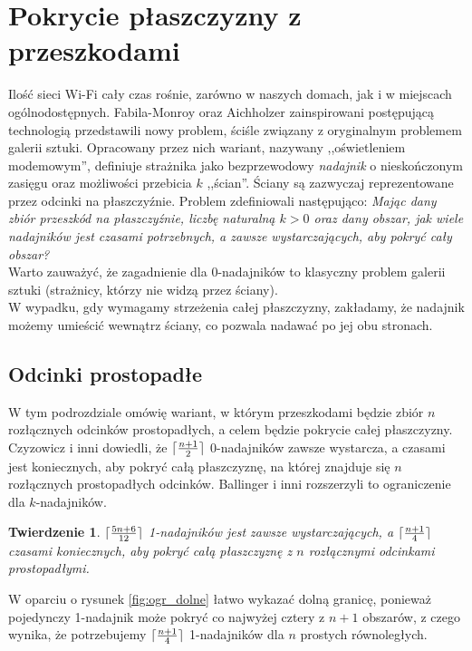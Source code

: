 \documentclass{xmgr}
\DeclarePairedDelimiter\ceil{\lceil}{\rceil}
\newtheorem{Twierdzenie}{Twierdzenie}
\theoremstyle{definition}
\begin{document}
\section{Pokrycie płaszczyzny z przeszkodami}\label{sec:knadajniki}
	Ilość sieci Wi-Fi cały czas rośnie, zarówno w naszych domach, jak i w miejscach ogólnodostępnych. Fabila-Monroy oraz Aichholzer \cite{fabilamonroy} zainspirowani postępującą technologią przedstawili nowy problem, ściśle związany z oryginalnym problemem galerii sztuki. Opracowany przez nich wariant, nazywany ,,oświetleniem modemowym'', definiuje strażnika jako bezprzewodowy \emph{nadajnik} o nieskończonym zasięgu oraz możliwości przebicia $k$ ,,ścian''. Ściany są zazwyczaj reprezentowane przez odcinki na płaszczyźnie. Problem zdefiniowali następująco: \emph{Mając dany zbiór przeszkód na płaszczyźnie, liczbę naturalną $k > 0$ oraz dany obszar, jak wiele nadajników jest czasami potrzebnych, a zawsze wystarczających, aby pokryć cały obszar?}  
\\\indent Warto zauważyć, że zagadnienie dla 0-nadajników to klasyczny problem galerii sztuki (strażnicy, którzy nie widzą przez ściany).
\\\indent W wypadku, gdy wymagamy strzeżenia całej płaszczyzny, zakładamy, że nadajnik możemy umieścić wewnątrz ściany, co pozwala nadawać po jej obu stronach.
\subsection{Odcinki prostopadłe}
W tym podrozdziale omówię wariant, w którym przeszkodami będzie zbiór $n$ rozłącznych odcinków prostopadłych, a celem będzie pokrycie całej płaszczyzny. Czyzowicz i inni \cite{czyzowicz} dowiedli, że $\ceil{\frac{n+1}{2}}$ 0-nadajników zawsze wystarcza, a czasami jest koniecznych, aby pokryć całą płaszczyznę, na której znajduje się $n$ rozłącznych prostopadłych odcinków. Ballinger i inni \cite{knadajniki} rozszerzyli to ograniczenie dla $k$-nadajników.

\begin{Twierdzenie} \label{ograniczenie zbiór odcinków prostopadłych} \cite{knadajniki}
  $\ceil{\frac{5n+6}{12}}$ 1-nadajników jest zawsze wystarczających, a $\ceil{\frac{n+1}{4}}$ czasami koniecznych, aby pokryć całą płaszczyznę z $n$ rozłącznymi odcinkami prostopadłymi.
\end{Twierdzenie}
\indent W oparciu o rysunek \ref{fig:ogr_dolne} łatwo wykazać dolną granicę, ponieważ pojedynczy 1-nadajnik może pokryć co najwyżej cztery z $n + 1$ obszarów, z czego wynika, że potrzebujemy $\ceil{\frac{n+1}{4}}$ 1-nadajników dla $n$ prostych równoległych.
\end{document}
